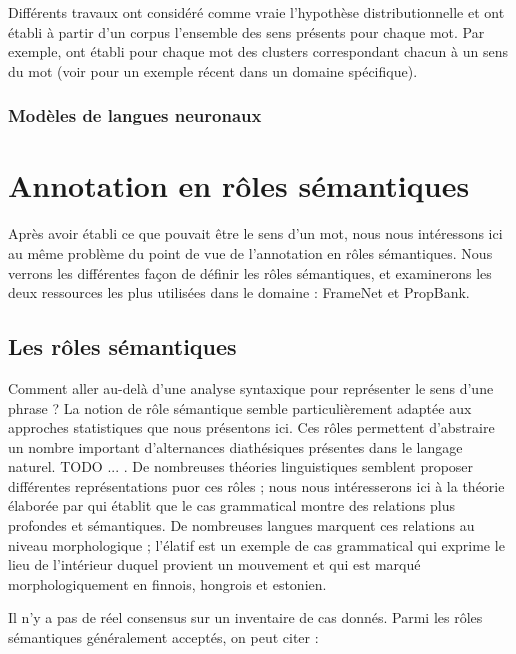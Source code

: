 Différents travaux ont considéré comme vraie l'hypothèse distributionnelle et
ont établi à partir d'un corpus l'ensemble des sens présents pour chaque mot.
Par exemple,
\cite{schutze1998automatic,pantel2002discovering,niu2007three,pedersen2010duluth}
ont établi pour chaque mot des clusters correspondant chacun à un sens du mot
(voir \cite{liu2012semantic} pour un exemple récent dans un domaine
spécifique).

\subsubsection{Modèles de langues neuronaux}

\section{Annotation en rôles sémantiques}
\label{senssituation}

Après avoir établi ce que pouvait être le sens d'un mot, nous nous intéressons
ici au même problème du point de vue de l'annotation en rôles sémantiques. Nous
verrons les différentes façon de définir les rôles sémantiques, et examinerons
les deux ressources les plus utilisées dans le domaine : FrameNet et PropBank.

\subsection{Les rôles sémantiques}
\label{subsec:roles_semantiques}

Comment aller au-delà d'une analyse syntaxique pour représenter le sens d'une
phrase ? La notion de rôle sémantique semble particulièrement adaptée aux
approches statistiques que nous présentons ici. Ces rôles permettent
d'abstraire un nombre important d'alternances diathésiques présentes dans le
langage naturel. TODO ... . De nombreuses théories linguistiques semblent
proposer différentes représentations puor ces rôles ; nous nous intéresserons
ici à la théorie élaborée par \cite{fillmore1968case} qui établit que le cas
grammatical montre des relations plus profondes et sémantiques. De nombreuses
langues marquent ces relations au niveau morphologique ; l'élatif est un
exemple de cas grammatical qui exprime le lieu de l'intérieur duquel provient
un mouvement et qui est marqué morphologiquement en finnois, hongrois et
estonien.

Il n'y a pas de réel consensus sur un inventaire de cas donnés. Parmi les rôles
sémantiques généralement acceptés, on peut citer :

